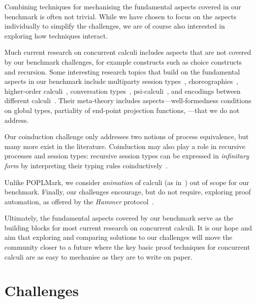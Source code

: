 \documentclass[runningheads]{llncs}
\begin{document}
Combining techniques for mechanising the fundamental aspects covered in our benchmark is often not trivial.
While we have chosen to focus on the aspects individually to simplify the challenges, we are of course also interested in exploring how techniques interact.

Much current research on concurrent calculi includes aspects that are
not covered by our benchmark challenges, for example constructs such as
choice constructs and recursion.
Some interesting research topics that build on the
fundamental aspects in our benchmark include multiparty session
types~\cite{10.1145/2827695}, choreographies~\cite{Carbone2013},
higher-order calculi~\cite{Hirsch2022}, conversation
types~\cite{DBLP:journals/tcs/CairesV10}, psi-calculi~\cite{lmcs:696},
and encodings between different
calculi~\cite{DBLP:journals/iandc/Gorla10,DBLP:journals/iandc/DardhaGS17}.
Their meta-theory includes aspects---\eg well-formedness conditions on
global types, partiality of end-point projection functions,
\etc---that we do not address.

Our coinduction challenge only addresses two notions of process equivalence, but many more exist in the literature.
Coinduction may also play a role in recursive processes and session types: recursive session types can be expressed in \emph{infinitary form} by interpreting their typing rules coinductively~\cite{DerakhshanPfenning22,HornePadovani23}.

Unlike POPLMark, we consider \emph{animation} of calculi (as in~\cite{Castro-Perez2021}) out of scope for our benchmark.
Finally, our challenges encourage, but do not require, exploring proof automation, as offered by \eg the \emph{Hammer} protocol~\cite{BohmeN10,CzajkaK18}.

Ultimately, the fundamental aspects covered by our benchmark serve as the building blocks for most current research on concurrent calculi.
It is our hope and aim that exploring and comparing solutions to our challenges will move the community closer to a future where the key basic proof techniques for concurrent calculi are as easy to mechanise as they are to write on paper.




\clearpage
\appendix
\section{Challenges}\label{app:challenges}

\end{document}
